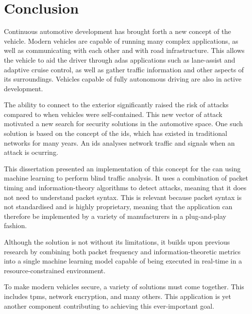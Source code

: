 \chapter{Conclusion}
\label{c:conclusion}

Continuous automotive development has brought forth a new concept of the vehicle. Modern vehicles are capable of running many complex applications, as well as communicating with each other and with road infrastructure. This allows the vehicle to aid the driver through \gls{adas} applications such as lane-assist and adaptive cruise control, as well as gather traffic information and other aspects of its surroundings. Vehicles capable of fully autonomous driving are also in active development.\par

The ability to connect to the exterior significantly raised the risk of attacks compared to when vehicles were self-contained. This new vector of attack motivated a new search for security solutions in the automotive space. One such solution is based on the concept of the \gls{ids}, which has existed in traditional networks for many years. An \gls{ids} analyses network traffic and signals when an attack is ocurring.\par

This dissertation presented an implementation of this concept for the \acrlong{can} using machine learning to perform blind traffic analysis. It uses a combination of packet timing and information-theory algorithms to detect attacks, meaning that it does not need to understand packet syntax. This is relevant because packet syntax is not standardised and is highly proprietary, meaning that the application can therefore be implemented by a variety of manufacturers in a plug-and-play fashion.\par

Although the solution is not without its limitations, it builds upon previous research by combining both packet frequency and information-theoretic metrics into a single machine learning model capable of being executed in real-time in a resource-constrained environment.\par

To make modern vehicles secure, a variety of solutions must come together. This includes \glspl{tpm}, network encryption, and many others. This application is yet another component contributing to achieving this ever-important goal.
